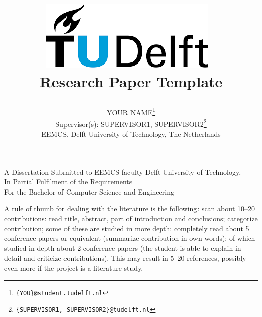 \documentclass[english]{article}
\begin{document}
\title{

\includegraphics{tudelftlogo.png}~
\\[5cm]
Research Paper Template}

\author{YOUR NAME\footnote{\texttt{\{YOU\}@student.tudelft.nl}}\\
Supervisor(s): SUPERVISOR1, SUPERVISOR2\footnote{\texttt{\{SUPERVISOR1, SUPERVISOR2\}@tudelft.nl}}\\
EEMCS, Delft University of Technology, The Netherlands
}

\maketitle
\vfill
\begin{center}
A Dissertation Submitted to EEMCS faculty Delft University of Technology,\\
In Partial Fulfilment of the Requirements\\
For the Bachelor of Computer Science and Engineering
\end{center}


\newpage























A rule of thumb for dealing with the literature is the following: scan about 10--20 contributions: read title, abstract, part of introduction and conclusions; categorize contribution; some of these are studied in more depth: completely read about 5 conference papers or equivalent (summarize contribution in own words); of which studied in-depth about 2 conference papers (the student is able to explain in detail and criticize contributions). This may result in 5--20 references, possibly even more if the project is a literature study.
\end{document}
